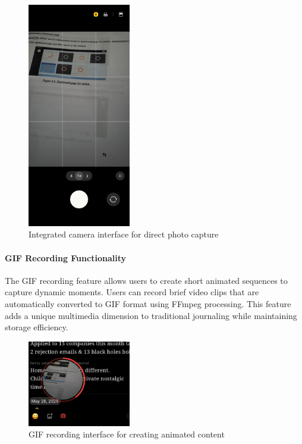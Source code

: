 \begin{figure}[H]
\centering
\includegraphics[width=0.4\textwidth]{files/imgs/prototype/camera_interface.jpeg}
\caption{Integrated camera interface for direct photo capture}
\label{fig:camera-interface}
\end{figure}

\paragraph{GIF Recording Functionality}

The GIF recording feature allows users to create short animated sequences to capture dynamic moments. Users can record brief video clips that are automatically converted to GIF format using FFmpeg processing. This feature adds a unique multimedia dimension to traditional journaling while maintaining storage efficiency.

\begin{figure}[H]
\centering
\includegraphics[width=0.4\textwidth]{files/imgs/prototype/gif_recording.jpeg}
\caption{GIF recording interface for creating animated content}
\label{fig:gif-recording}
\end{figure}


